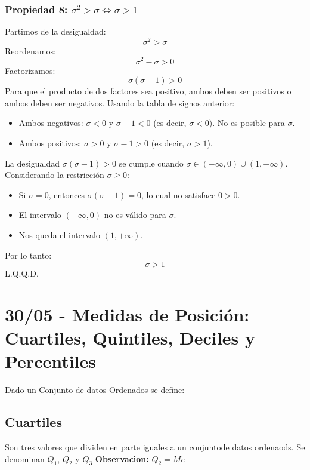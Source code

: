 \documentclass[12pt, letterpaper]{article}
\begin{document}
            \subsubsection{Propiedad 8: $\sigma^2 > \sigma \iff \sigma > 1$}
                Partimos de la desigualdad:
                \[\sigma^2 > \sigma \]
                Reordenamos:
                \[\sigma^2-\sigma > 0 \]
                Factorizamos:
                \[\sigma(\sigma-1) > 0 \]
                Para que el producto de dos factores sea positivo, ambos deben ser positivos o ambos deben ser negativos. Usando la tabla de signos anterior:
                \begin{itemize}
                    \item Ambos negativos: $\sigma < 0$ y $\sigma-1 < 0$ (es decir, $\sigma < 0$). No es posible para $\sigma$.
                    \item Ambos positivos: $\sigma > 0$ y $\sigma-1 > 0$ (es decir, $\sigma > 1$).
                \end{itemize}
                La desigualdad $\sigma(\sigma-1) > 0$ se cumple cuando $\sigma \in (-\infty, 0) \cup (1, +\infty)$.
                Considerando la restricción $\sigma \ge 0$:
                \begin{itemize}
                    \item Si $\sigma=0$, entonces $\sigma(\sigma-1)=0$, lo cual no satisface $0>0$.
                    \item El intervalo $(-\infty,0)$ no es válido para $\sigma$.
                    \item Nos queda el intervalo $(1, +\infty)$.
                \end{itemize}
                Por lo tanto:
                \[\sigma > 1\]
                L.Q.Q.D.
                \newpage



\section{30/05 - Medidas de Posición: Cuartiles, Quintiles, Deciles y Percentiles}
Dado un Conjunto de datos Ordenados se define:

\subsection{Cuartiles}
Son tres valores que dividen en parte iguales a un conjuntode datos ordenaods. Se denominan $Q_1$, $Q_2$ y $Q_3$
\textbf{Observacion:} $Q_2 = Me$
\end{document}
